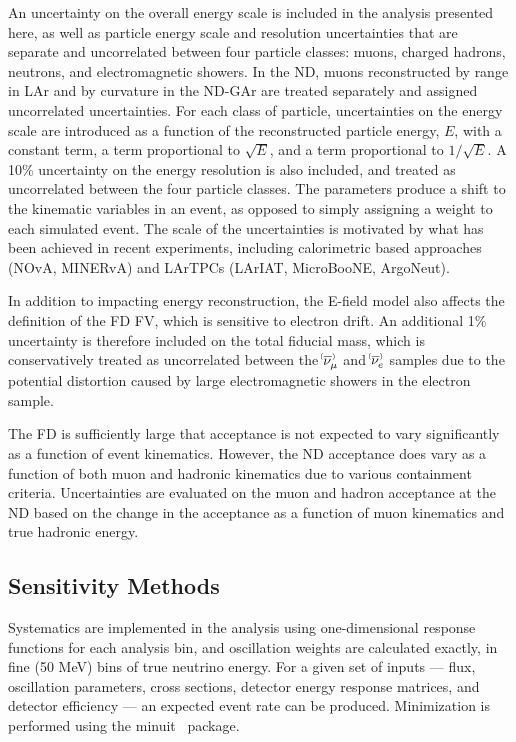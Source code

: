 An uncertainty on the overall energy scale is included in the analysis presented here, as well as particle energy scale and resolution uncertainties that are separate and uncorrelated between four particle classes: muons, charged hadrons, neutrons, and electromagnetic showers. In the ND, muons reconstructed by range in LAr and by curvature in the ND-GAr are treated separately and assigned uncorrelated uncertainties. For each class of particle, uncertainties on the energy scale are introduced as a function of the reconstructed particle energy, $E$, with a constant term, a term proportional to $\sqrt{E}$, and a term proportional to $1/\sqrt{E}$. A 10\% uncertainty on the energy resolution is also included, and treated as uncorrelated between the four particle classes. The parameters produce a shift to the kinematic variables in an event, as opposed to simply assigning a weight to each simulated event. The scale of the uncertainties is motivated by what has been achieved in recent experiments, including calorimetric based approaches (NOvA, MINERvA) and LArTPCs (LArIAT, MicroBooNE, ArgoNeut).

In addition to impacting energy reconstruction, the E-field model also affects the definition of the FD FV, which is sensitive to electron drift. An additional 1\% uncertainty is therefore included on the total fiducial mass, which is conservatively treated as uncorrelated between the $\nu^{\bracketbar}_{\mu}$ and $\nu^{\bracketbar}_{e}$ samples due to the potential distortion caused by large electromagnetic showers in the electron sample.

The FD is sufficiently large that acceptance is not expected to vary significantly as a function of event kinematics. However, the ND acceptance does vary as a function of both muon and hadronic kinematics due to various containment criteria. Uncertainties are evaluated on the muon and hadron acceptance at the ND based on the change in the acceptance as a function of muon kinematics and true hadronic energy.

\subsection{Sensitivity Methods}
Systematics are implemented in the analysis using one-dimensional response functions for each analysis bin, and oscillation weights are calculated exactly, in fine (50 MeV) bins of true neutrino energy. For a given set of inputs --- flux, oscillation parameters, cross sections, detector energy response matrices, and detector efficiency --- an expected event rate can be produced. Minimization is performed using the {\sc minuit}~\cite{James:1994vla} package.


